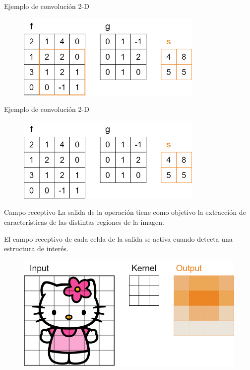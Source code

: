 \begin{frame}{Ejemplo de convolución 2-D}
\begin{figure}
    \centering
    \includegraphics[width=0.8\textwidth]{figures/Tema 2/Convolucion2D_5.png}
\end{figure}
\end{frame}

\begin{frame}{Ejemplo de convolución 2-D}
\begin{figure}
    \centering
    \includegraphics[width=0.8\textwidth]{figures/Tema 2/Convolucion2D_Res.png}
\end{figure}
\end{frame}

\begin{frame}{Campo receptivo}
La salida de la \alert{operación} tiene como objetivo la \alert{extracción de características} de las distintas \alert{regiones de la imagen}.

El \alert{campo receptivo} de cada celda de la salida se \alert{activa} cuando detecta una \alert{estructura de interés}.

\begin{figure}
    \centering
    \includegraphics[width=\textwidth]{figures/Tema 3/ReceptiveActivation.png}
\end{figure}
\end{frame}

